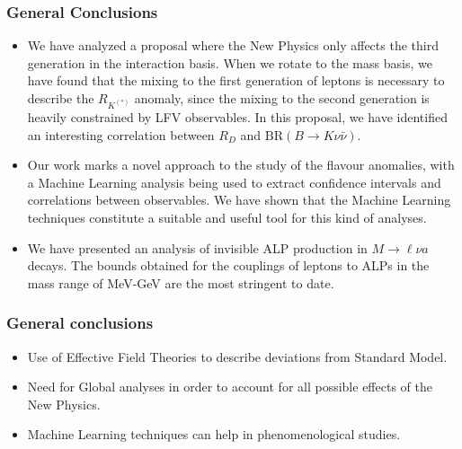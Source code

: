\documentclass[mathserif, 10pt]{beamer}
\begin{document}
\begin{frame}\frametitle{General Conclusions}
    \begin{itemize}
        \item We have analyzed a proposal where the New Physics only affects the third generation in the interaction basis. When we rotate to the mass basis, we have found that the mixing to the first generation of leptons is necessary to describe the $R_{K^{(*)}}$ anomaly, since the mixing to the second generation is heavily constrained by LFV observables. In this proposal, we have identified an interesting correlation between $R_D$ and $\mathrm{BR}(B\to K \nu \bar{\nu})$.
        \item  Our work marks a novel approach to the study of the flavour anomalies, with a Machine Learning analysis being used to extract confidence intervals and correlations
              between observables. We have shown that the Machine Learning techniques constitute a suitable and useful tool for this kind of analyses.
        \item We have presented an analysis of invisible ALP production in $M\to \ell \nu a$ decays. The bounds obtained for the couplings of leptons to ALPs in the mass range of MeV-GeV are the most stringent to date.
    \end{itemize}
\end{frame}

\begin{frame}\frametitle{General conclusions}
    \begin{itemize}
        \item Use of Effective Field Theories to describe deviations from Standard Model.
        \item Need for Global analyses in order to account for all possible effects of the New Physics.
        \item Machine Learning techniques can help in phenomenological studies.
    \end{itemize}
\end{frame}
\end{document}
